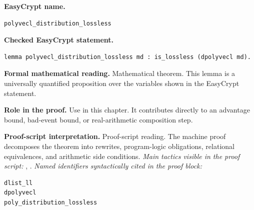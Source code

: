 \begin{formaltheorem}
\noindent\textbf{EasyCrypt name.}
\begin{lstlisting}[language=EasyCrypt,basicstyle=\ttfamily\scriptsize]
polyvecl_distribution_lossless
\end{lstlisting}
\noindent\textbf{Checked EasyCrypt statement.}
\begin{lstlisting}[language=EasyCrypt,basicstyle=\ttfamily\scriptsize]
lemma polyvecl_distribution_lossless md : is_lossless (dpolyvecl md).
\end{lstlisting}
\noindent\textbf{Formal mathematical reading.}
Mathematical theorem. This lemma is a universally quantified proposition over the variables shown in the EasyCrypt statement.

\noindent\textbf{Role in the proof.}
Use in this chapter. It contributes directly to an advantage bound, bad-event bound, or real-arithmetic composition step.

\noindent\textbf{Proof-script interpretation.}
Proof-script reading. The machine proof decomposes the theorem into rewrites, program-logic obligations, relational equivalences, and arithmetic side conditions.
\emph{Main tactics visible in the proof script:} , .
\emph{Named identifiers syntactically cited in the proof block:}
\begin{lstlisting}[language=EasyCrypt,basicstyle=\ttfamily\scriptsize]
dlist_ll
dpolyvecl
poly_distribution_lossless
\end{lstlisting}

\end{formaltheorem}

